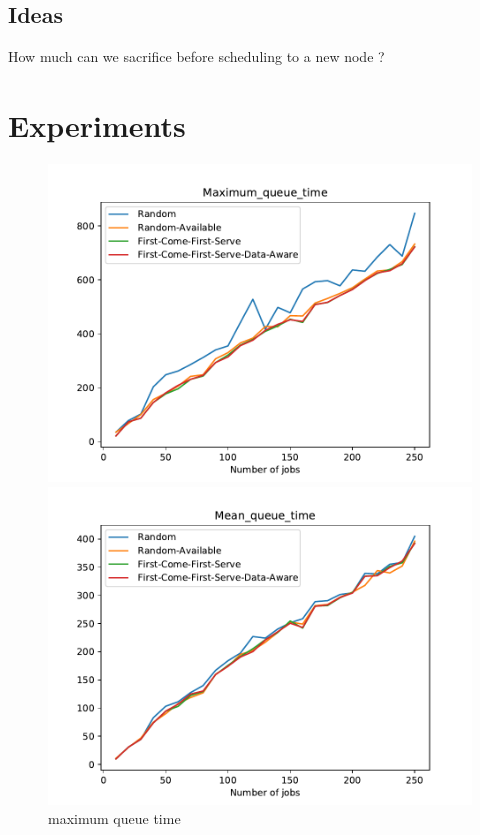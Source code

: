 \documentclass[a4paper]{article}
\begin{document}
\subsection{Ideas}
How much can we sacrifice before scheduling to a new node ?

\section{Experiments}

\begin{figure}[ht] 
  \label{ fig7} 
  \begin{minipage}[b]{0.5\linewidth}
    \centering
    \includegraphics[width=1.11\linewidth]{MBSS/plot/Maximum_queue_time.pdf} 
    \caption{maximum queue time} 
    \vspace{4ex}
  \end{minipage}%
  \begin{minipage}[b]{0.5\linewidth}
    \centering
    \includegraphics[width=1.11\linewidth]{MBSS/plot/Mean_queue_time.pdf} 

\end{minipage}
\end{figure}
\end{document}
